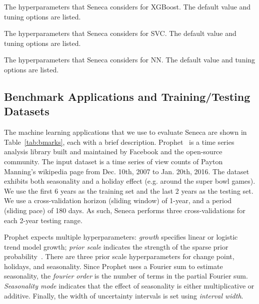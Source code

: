 \begin{table}[t]
\centering
\scriptsize

\caption{The hyperparameters that Seneca considers for XGBoost. 
The default value and tuning options are listed. 
\label{tab:xgboost_para}}
\end{table}

\begin{table}[t]
\centering
\scriptsize

\caption{The hyperparameters that Seneca considers for SVC. 
The default value and tuning options are listed. 
\label{tab:svc_para}}
\vspace{-0.2in}
\end{table}

\begin{table}[t]
\centering
\scriptsize

\caption{The hyperparameters that Seneca considers for NN.
The default value and tuning options are listed. 
\label{tab:nn_para}}
\vspace{-0.2in}
\end{table}


\subsection{Benchmark Applications and Training/Testing  Datasets}
The machine learning applications that we use to evaluate Seneca 
are shown in Table~\ref{tab:bmarks}, each with 
a brief description.
Prophet~\cite{ref:prophet} is a time series analysis library built and maintained by Facebook and the open-source community. The input dataset is a time series of view counts
of Payton Manning's wikipedia page from Dec. 10th, 2007 to Jan. 20th, 2016. 
The dataset exhibits both seasonality and a holiday effect (e.g. around the super bowl games). 
We use the first 6 years as the training set and the last 2 years as the testing set.
We use a cross-validation horizon (sliding window) of 1-year, 
and a period (sliding pace) 
of 180 days.  As such, Seneca performs three cross-validations for each 2-year testing range.

Prophet expects multiple hyperparameters: \textit{growth} specifies linear or logistic trend model growth; \textit{prior scale} indicates the strength of the 
sparse prior probability~\cite{ref:sparse_prior}. 
There are three prior scale hyperparameters for change point, holidays, and seasonality. 
Since Prophet uses a Fourier sum to estimate seasonality, 
the \textit{fourier order} is the number of terms in the partial Fourier 
sum. \textit{Seasonality mode} indicates that the effect of seasonality is either 
multiplicative or additive. Finally, the width of uncertainty intervals 
is set using \textit{interval width}.

